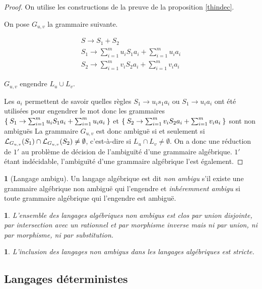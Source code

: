 \documentclass[11pt,a4paper]{article}
\theoremstyle{plain}
\theoremstyle{definition}
\newtheorem{defn}[thm]{\protect\definitionname}
\theoremstyle{definition}
\theoremstyle{remark}
\theoremstyle{remark}
\theoremstyle{plain}
\theoremstyle{plain}
\newtheorem{prop}[thm]{\protect\propositionname}
\theoremstyle{plain}
\theoremstyle{remark}
\providecommand{\definitionname}{Définition}
\providecommand{\propositionname}{Proposition}
\begin{document}
\begin{proof}
	On utilise les constructions de la preuve de la proposition \ref{thindec}.
	
	On pose $G_{u,v}$ la grammaire suivante.
	
	\[\begin{array}{l}
		\displaystyle S \to S_1 + S_2\\
		\displaystyle S_1 \to \sum_{i=1}^m u_i S_1 a_i + \sum_{i=1}^m u_i a_i\\
		\displaystyle S_2 \to \sum_{i=1}^m v_i S_2 a_i + \sum_{i=1}^m v_i a_i
	\end{array}\]
	
	$G_{u,v}$ engendre $L_u\cup L_v$.
	
	Les $a_i$ permettent de savoir quelles règles $S_1\to u_i s_1 a_i$ ou $S_1\to u_i a_i$ ont été utilisées pour engendrer le mot donc les grammaires\\$\Set{S_1 \to \sum_{i=1}^m u_i S_1 a_i + \sum_{i=1}^m u_i a_i}$ et $\Set{S_2 \to \sum_{i=1}^m v_i S_2 a_i + \sum_{i=1}^m v_i a_i}$ sont non ambiguës La grammaire $G_{u,v}$ est donc ambiguë si et seulement si $\mathcal{L}_{G_{u,v}}(S_1)\cap \mathcal{L}_{G_{u,v}}(S_2)\not=\emptyset$, c'est-à-dire si $L_u\cap L_v\not=\emptyset$. On a donc une réduction de $1'$ au problème de décision de l'ambiguïté d'une grammaire algébrique. $1'$ étant indécidable, l'ambiguïté d'une grammaire algébrique l'est également.
\end{proof}

\begin{defn}[Langage ambigu] %
	Un langage algébrique est dit \emph{non ambigu} s'il existe une grammaire algébrique non ambiguë qui l'engendre et \emph{inhéremment ambigu} si toute grammaire algébrique qui l'engendre est ambiguë.
\end{defn}

\begin{prop}
	L'ensemble des langages algébriques non ambigus est clos par union disjointe, par intersection avec un rationnel et par morphisme inverse mais ni par union, ni par morphisme, ni par substitution. %
\end{prop}

\begin{prop} %
	L'inclusion des langages non ambigus dans les langages algébriques est stricte.
\end{prop}

\subsection{Langages déterministes} %
\end{document}
